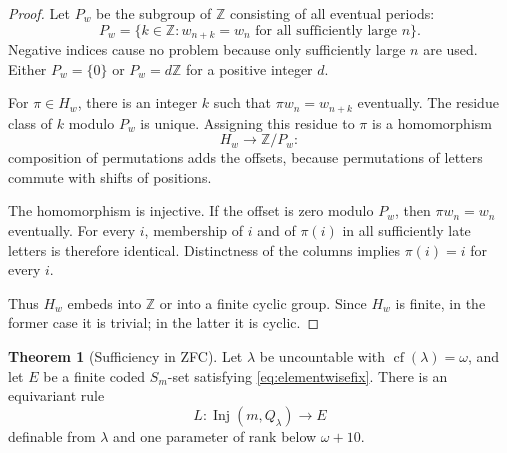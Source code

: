 \documentclass[11pt,letterpaper]{article}
\theoremstyle{definition}
\newtheorem{theorem}[definition]{Theorem}
\numberwithin{equation}{section}
\newcommand{\cf}{\operatorname{cf}}
\newcommand{\Inj}{\operatorname{Inj}}
\newcommand{\Z}{\mathbb Z}
\begin{document}
\begin{proof}
Let $P_w$ be the subgroup of $\Z$ consisting of all eventual periods:
\[
 P_w=\{k\in\Z:w_{n+k}=w_n\text{ for all sufficiently large }n\}.
\]
Negative indices cause no problem because only sufficiently large $n$ are used. Either $P_w=\{0\}$ or $P_w=d\Z$ for a positive integer $d$.

For $\pi\in H_w$, there is an integer $k$ such that
$\pi w_n=w_{n+k}$ eventually. The residue class of $k$ modulo $P_w$ is unique. Assigning this residue to $\pi$ is a homomorphism
\[
 H_w\longrightarrow\Z/P_w:
\]
composition of permutations adds the offsets, because permutations of letters commute with shifts of positions.

The homomorphism is injective. If the offset is zero modulo $P_w$, then $\pi w_n=w_n$ eventually. For every $i$, membership of $i$ and of $\pi(i)$ in all sufficiently late letters is therefore identical. Distinctness of the columns implies $\pi(i)=i$ for every $i$.

Thus $H_w$ embeds into $\Z$ or into a finite cyclic group. Since $H_w$ is finite, in the former case it is trivial; in the latter it is cyclic.
\end{proof}

\begin{theorem}[Sufficiency in ZFC]\label{thm:label-sufficiency}
Let $\lambda$ be uncountable with $\cf(\lambda)=\omega$, and let $E$ be a finite coded $S_m$-set satisfying \eqref{eq:elementwisefix}. There is an equivariant rule
\[
 L:\Inj(m,Q_\lambda)\longrightarrow E
\]
definable from $\lambda$ and one parameter of rank below $\omega+10$.
\end{theorem}
\end{document}
